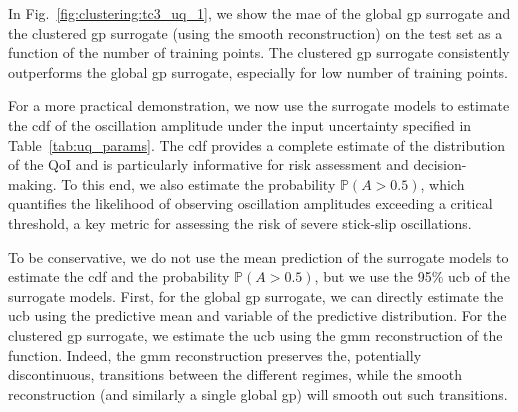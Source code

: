 In Fig.~\ref{fig:clustering:tc3_uq_1}, we show the \gls{mae} of the global \gls{gp} surrogate and the clustered \gls{gp} surrogate (using the smooth reconstruction) on the test set as a function of the number of training points. The clustered \gls{gp} surrogate consistently outperforms the global \gls{gp} surrogate, especially for low number of training points.

\smallskip
For a more practical demonstration, we now use the surrogate models to estimate the \gls{cdf} of the oscillation amplitude under the input uncertainty specified in Table~\ref{tab:uq_params}. The \gls{cdf} provides a complete estimate of the distribution of the QoI and is particularly informative for risk assessment and decision-making. To this end, we also estimate the probability $\mathbb{P}(A > 0.5)$, which quantifies the likelihood of observing oscillation amplitudes exceeding a critical threshold, a key metric for assessing the risk of severe stick-slip oscillations.

\smallskip
To be conservative, we do not use the mean prediction of the surrogate models to estimate the \gls{cdf} and the probability $\mathbb{P}(A > 0.5)$, but we use the 95\% \gls{ucb} of the surrogate models. First, for the global \gls{gp} surrogate, we can directly estimate the \gls{ucb} using the predictive mean and variable of the predictive distribution. For the clustered \gls{gp} surrogate, we estimate the \gls{ucb} using the \gls{gmm} reconstruction of the function. Indeed, the \gls{gmm} reconstruction preserves the, potentially discontinuous, transitions between the different regimes, while the smooth reconstruction (and similarly a single global \gls{gp}) will smooth out such transitions.


